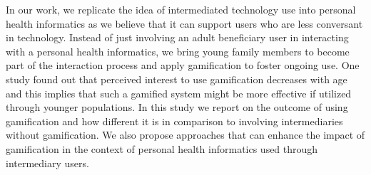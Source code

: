 \documentclass{sig-alternate}
\begin{document}
In our work, we replicate the idea of intermediated technology use into personal health informatics as we believe that it can support users who are less conversant in technology. Instead of just involving an adult beneficiary user in interacting with a personal health informatics, we bring young family members to become part of the interaction process and apply gamification to foster ongoing use. One study found out that perceived interest to use gamification decreases with age and this implies that such a gamified system might be more effective if utilized through younger populations\cite{v2014motivational}.\newline
In this study we report on the outcome of using gamification and how different it is in comparison to involving intermediaries without gamification. We also propose approaches that can enhance the impact of gamification in the context of personal health informatics used through intermediary users.
\end{document}
